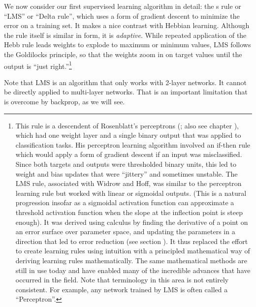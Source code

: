We now consider our first supervised learning algorithm in detail: the s rule or ``LMS'' or ``Delta rule'', which uses a form of gradient descent to minimize the error on a training set. It makes a nice contrast with Hebbian learning. Although the rule itself is similar in form, it is \emph{adaptive}.  While repeated application of the Hebb rule leads weights to explode to maximum or minimum values, LMS follows the Goldilocks principle, so that the weights zoom in on target values until the output is ``just right.''\footnote{This rule is a descendent of Rosenblatt's perceptrons (\cite{rosenblatt1960perceptron}; also see chapter ), which had one weight layer and a single binary output that was applied to classification tasks.  His perceptron learning algorithm involved an if-then rule which would apply a form of gradient descent if an input was misclassified. Since both targets and outputs were thresholded binary units, this led to weight and bias updates that were ``jittery'' and sometimes unstable. The LMS rule, associated with Widrow and Hoff, was similar to the perceptron learning rule but worked with linear or sigmoidal outputs. (This is a natural progression insofar as a sigmoidal activation function can approximate a threshold activation function when the slope at the inflection point is steep enough). It was derived using calculus by finding the derivative of a point on an error surface over parameter space, and updating the parameters in a direction that led to error reduction (see section ). It thus replaced the effort to create learning rules using intuition with a principled mathematical way of deriving learning rules mathematically. The same mathematical methods are still in use today and have enabled many of the incredible advances that have occurred in the field. Note that terminology  in this  area is not entirely consistent. For example, any network trained by LMS is often called a ``Perceptron''. }  

Note that LMS is an algorithm that only works with 2-layer networks. It cannot be directly applied to multi-layer networks. That is an important limitation that is overcome by backprop, as we will see.

